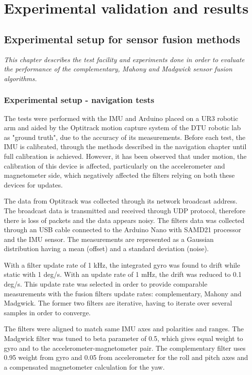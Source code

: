 \chapter{Experimental validation and results}
\section{Experimental setup for sensor fusion methods}

\textit{This chapter describes the test facility and experiments done in order to evaluate the performance of the complementary, Mahony and Madgwick sensor fusion algorithms.}

\subsection{Experimental setup - navigation tests}

The tests were performed with the IMU and Arduino placed on a UR3 robotic arm and aided by the Optitrack motion capture system of the DTU robotic lab as "ground truth", due to the accuracy of its measurements. 
Before each test, the IMU is calibrated, through the methods described in the navigation chapter until full calibration is achieved. However, it has been observed that under motion, the calibration of this device is affected, particularly on the accelerometer and magnetometer side, which negatively affected the filters relying on both these devices for updates. 

The data from Optitrack was collected through its network broadcast address. The broadcast data is transmitted and received through UDP protocol, therefore there is loss of packets and the data appears noisy. 
The filters data was collected through an USB cable connected to the Arduino Nano with SAMD21 processor and the IMU sensor. The measurements are represented as a Gaussian distribution having a mean (offset) and a standard deviation (noise). 

With a filter update rate of 1 kHz, the integrated gyro was found to drift while static with 1 deg/s. With an update rate of 1 mHz, the drift was reduced to 0.1 deg/s. This update rate was selected in order to provide comparable measurements with the fusion filters update rates: complementary, Mahony and Madgwick. The former two filters are iterative, having to iterate over several samples in order to converge. 

The filters were aligned to match same IMU axes and polarities and ranges. The Madgwick filter was tuned to beta parameter of 0.5, which gives equal weight to gyro and to the accelerometer-magnetometer pair. The complementary filter uses 0.95 weight from gyro and 0.05 from accelerometer for the roll and pitch axes and a compensated magnetometer calculation for the yaw. 



